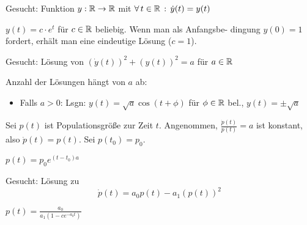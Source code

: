 \documentclass{cheat-sheet}
\begin{document}



\iffalse
\begin{bsp}
  Gesucht: Funktion $y : \mathbb{R} \to \mathbb{R}$ mit $\forall \, {t \in \mathbb{R}} \,:\, \dot{y}(t) = y(t)$\\
\end{bsp}

\begin{lsg}
  $y(t) = c \cdot e^t$ für $c \in \mathbb{R}$ beliebig. Wenn man als Anfangsbe- dingung $y(0) = 1$ fordert, erhält man eine eindeutige Lösung ($c = 1$).
\end{lsg}

\begin{bsp}
  Gesucht: Lösung von $\left(\dot{y}(t)\right)^2 + \left(y(t)\right)^2 = a$ für $a \in \mathbb{R}$\\
\end{bsp}

\begin{lsg}
  Anzahl der Lösungen hängt von $a$ ab:
  \begin{itemize}
    \item Falls $a > 0$: Lsgn: $y(t) = \sqrt{a} \cos(t + \phi)$ für $\phi \in \mathbb{R}$ bel., $y(t) = \pm \sqrt{a}$
  \end{itemize}
\end{lsg}

\begin{bsp}
  Sei $p(t)$ ist Populationsgröße zur Zeit $t$.
  Angenommen, $\tfrac{\dot{p}(t)}{p(t)} = a$ ist konstant, also $\dot{p}(t) = p(t)$. Sei $p(t_0) = p_0$.
\end{bsp}

\begin{lsg}
  $p(t) = p_0 e^{(t-t_0) a}$
\end{lsg}

\begin{bsp}
  Gesucht: Lösung zu
  \[ \dot{p}(t) = a_0 p(t) - a_1 \left(p(t)\right)^2 \]
\end{bsp}

\begin{lsg}
  $p(t) = \frac{a_0}{a_1 (1 - c e^{-a_0 t})}$
\end{lsg}
\end{document}
